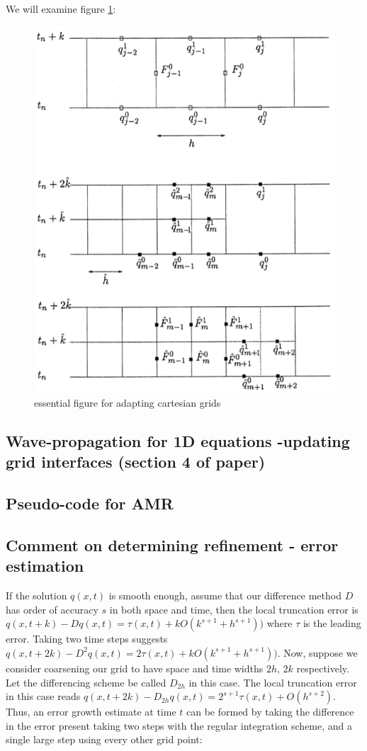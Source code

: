 \documentclass[12pt,leqno]{article}
\begin{document}
We will examine figure \ref{fig21}:
\begin{figure}[h]
    \centering
    \includegraphics[width=.65\textwidth]{berg-lev-fig21}
    \caption{essential figure for adapting cartesian grids}
    \label{fig21}
\end{figure}
 
 
\subsection{Wave-propagation for 1D equations -updating grid interfaces (section 4 of paper)}
\subsection{Pseudo-code for AMR}
\subsection{Comment on determining refinement - error estimation}
If the solution $q(x,t)$ is smooth enough, assume that our difference method $D$ has order of accuracy $s$ in both 
space and time, then the local truncation error is $q(x,t+k) -D q(x,t) = \tau(x,t) + k O(k^{s+1}+h^{s+1}))$ where $\tau$ is the leading error.
Taking two time steps suggests $q(x,t+2k) -D^2 q(x,t) = 2\tau(x,t) + k O(k^{s+1}+h^{s+1}))$.
Now, suppose we consider coarsening our grid to have space and time widths $2h$, $2k$ respectively. Let the differencing scheme be called $D_{2h}$ in this case. The local truncation error in this case reads $q(x,t+2k) -D_{2h} q(x,t) = 2^{s+1}\tau(x,t) + O(h^{s+2})$. Thus, an error growth estimate at time $t$ can be formed by taking the difference in the error present taking two steps with the regular integration scheme, and a single large step using every other grid point:
\end{document}
